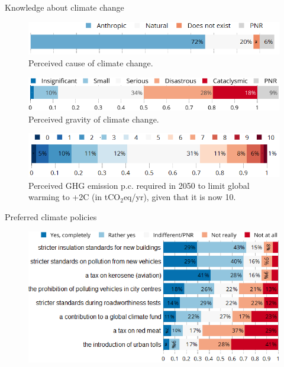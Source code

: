 \documentclass[aspectratio=169,9pt,dvipsnames]{beamer}
\begin{document}
    \begin{frame}{Knowledge about climate change}

\begin{figure}
\includegraphics[scale=0.5]{Images/CC_cause_nolegend.png}
\caption{Perceived cause of climate change.}
\end{figure}


\begin{figure}
\includegraphics[scale=0.53]{Images/CC_effects_nolegend.png}
\caption{Perceived gravity of climate change.}
\end{figure}


\begin{figure}
\includegraphics[scale=0.5]{Images/CC_target_emission_nolegend.png}
\caption{Perceived GHG emission p.c. required in 2050 to limit global warming to +2\textdegree{}C (in tCO$_\text{2}$eq/yr), given that it is now 10.}
\end{figure}

    \end{frame}
    \begin{frame}{Preferred climate policies}\label{preferred_climate_policies}

\begin{figure}
\includegraphics[scale=0.6]{Images/environmental_policies.png}
\end{figure}

\hyperlink{discussion}{}

    \end{frame}
\end{document}
